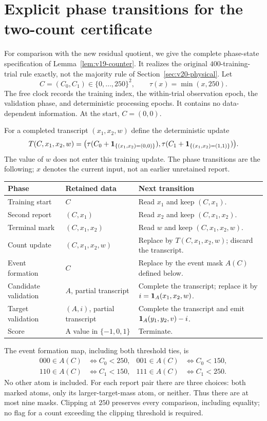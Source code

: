 \section{Explicit phase transitions for the two-count certificate}
\label{sec:v20-phases}
For comparison with the new residual quotient, we give the complete
phase-state specification of Lemma~\ref{lem:v19-counter}. It realizes
the original $400$-training-trial rule exactly, not the majority rule of
Section~\ref{sec:v20-physical}. Let
\[
 C=(C_0,C_1)\in\{0,\ldots,250\}^2,
 \qquad \tau(x)=\min(x,250).
\]
The free clock records the training index, the within-trial observation
epoch, the validation phase, and deterministic processing epochs. It
contains no data-dependent information. At the start, $C=(0,0)$.

For a completed transcript $(x_1,x_2,w)$ define the deterministic update
\[
 T(C,x_1,x_2,w)=
 \bigl(\tau(C_0+\mathbf 1_{\{(x_1,x_2)=(0,0)\}}),
       \tau(C_1+\mathbf 1_{\{(x_1,x_2)=(1,1)\}})\bigr).
\]
The value of $w$ does not enter this training update. The phase transitions
are the following; $x$ denotes the current input, not an earlier unretained
report.
\begin{center}
\small
\begin{tabular}{p{}p{}p{}}
\toprule
Phase & Retained data & Next transition\\
\midrule
Training start & $C$ & Read $x_1$ and keep $(C,x_1)$.\\
Second report & $(C,x_1)$ & Read $x_2$ and keep $(C,x_1,x_2)$.\\
Terminal mark & $(C,x_1,x_2)$ & Read $w$ and keep $(C,x_1,x_2,w)$.\\
Count update & $(C,x_1,x_2,w)$ & Replace by $T(C,x_1,x_2,w)$; discard the transcript.\\
Event formation & $C$ & Replace by the event mask $A(C)$ defined below.\\
Candidate validation & $A$, partial transcript & Complete the transcript; replace it by $i=\mathbf 1_A(x_1,x_2,w)$.\\
Target validation & $(A,i)$, partial transcript & Complete the transcript and emit $\mathbf 1_A(y_1,y_2,v)-i$.\\
Score & A value in $\{-1,0,1\}$ & Terminate.\\
\bottomrule
\end{tabular}
\end{center}
The event formation map, including both threshold ties, is
\begin{align*}
 000\in A(C)&\Longleftrightarrow C_0<250,&
 001\in A(C)&\Longleftrightarrow C_0<150,\\
 110\in A(C)&\Longleftrightarrow C_1<150,&
 111\in A(C)&\Longleftrightarrow C_1<250.
\end{align*}
No other atom is included. For each report pair there are three choices:
both marked atoms, only its larger-target-mass atom, or neither. Thus
there are at most nine masks. Clipping at $250$ preserves every comparison,
including equality; no flag for a count exceeding the clipping threshold
is required.

